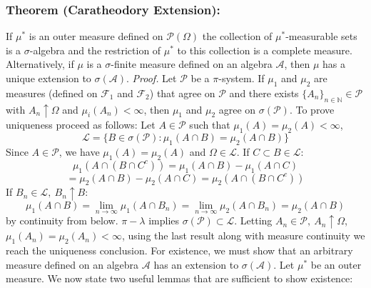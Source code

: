 \documentclass{article}
\begin{document}
\subsubsection{Theorem (Caratheodory Extension):}
If $\mu^*$ is an outer measure defined on $\mathcal{P}(\Omega)$ the collection of $\mu^*$-measurable sets is a $\sigma$-algebra and the restriction of $\mu^*$ to this collection is a complete measure.\newline \newline
Alternatively, if $\mu$ is a $\sigma$-finite measure defined on an algebra $\mathcal{A}$, then $\mu$ has a unique extension to $\sigma(\mathcal{A})$. \newline \newline
\textit{Proof.}\newline \newline
Let $\mathcal{P}$ be a $\pi$-system. If $\mu_1$ and $\mu_2$ are measures (defined on $\mathcal{F}_1$ and $\mathcal{F}_2$) that agree on $\mathcal{P}$ and there exists $\{A_n\}_{n\in \mathbb{N}} \in \mathcal{P}$ with $A_n \uparrow \Omega$ and $\mu_i(A_n) < \infty$, then $\mu_1$ and $\mu_2$ agree on $\sigma(\mathcal{P})$. To prove uniqueness proceed as follows:\newline \newline
Let $A \in \mathcal{P}$ such that $\mu_1(A) = \mu_2(A) < \infty$,
\[
\mathcal{L}
 = \{B \in \sigma(\mathcal{P}):\mu_1(A\cap B) = \mu_2(A\cap B) \}
\]
Since $A \in \mathcal{P}$, we have $\mu_1(A) = \mu_2(A)$ and $\Omega \in \mathcal{L}$. If $C\subset B\in \mathcal{L}$: 
\[
\mu_1(A\cap (B\cap C^c))= \mu_1(A \cap B) - \mu_1(A\cap C)
\] 
\[
=\mu_2(A\cap B)-\mu_2(A\cap C) = \mu_2(A\cap (B\cap C^c))
\]
If $B_n\in \mathcal{L}, \ B_n \uparrow B$:
\[
\mu_1(A\cap B ) = \lim_{n \to \infty}\mu_1(A \cap B_n) = \lim_{n \to \infty}\mu_2(A \cap B_n) = \mu_2(A\cap B ) 
\]
by continuity from below.\newline \newline
$\pi-\lambda$ implies $\sigma(\mathcal{P}) \subset\mathcal{L}$. Letting $A_n \in \mathcal{P},\ A_n \uparrow \Omega$, $\mu_1(A_n)=\mu_2(A_n)<\infty$, using the last result along with measure continuity we reach the uniqueness conclusion. \newline \newline
For existence, we must show that an arbitrary measure defined on an algebra $\mathcal{A}$ has an extension to $\sigma(\mathcal{A})$. Let $\mu^*$ be an outer measure. We now state two useful lemmas that are sufficient to show existence: \newline \newline
\end{document}
